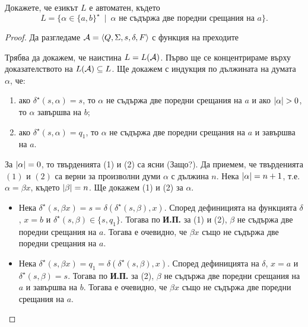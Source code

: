 \begin{problem}
  Докажете, че езикът $L$ е автоматен, където
  \[L = \{\alpha \in \{a,b\}^\star\ \mid\ \alpha\mbox{ не съдържа две поредни срещания на }a\}.\]
\end{problem}
\begin{proof}
  Да разгледаме $\mathcal{A} = \langle{Q,\Sigma,s,\delta,F}\rangle$ с функция на преходите
  \begin{figure}[H]
    \begin{center}
    \end{center}
 \end{figure}

 Трябва да докажем, че наистина $L = L(\mathcal{A})$.
 Първо ще се концентрираме върху доказателството на $L(\mathcal{A}) \subseteq L$.
 Ще докажем с индукция по дължината на думата $\alpha$, че:
 \begin{enumerate}[(1)]
 \item 
   ако $\delta^\star(s,\alpha) = s$, то
   $\alpha$ не съдържа две поредни срещания на $a$
   и ако $\lvert{\alpha}\rvert > 0$, то $\alpha$ завършва на $b$;
 \item
   ако $\delta^\star(s,\alpha) = q_1$, то
   $\alpha$ не съдържа две поредни срещания на $a$
   и завършва на $a$.
 \end{enumerate}

 За $\lvert{\alpha}\rvert = 0$, то твърденията (1) и (2) са ясни (Защо?).
 Да приемем, че твърденията $(1)$ и $(2)$ са верни за произволни думи $\alpha$ с дължина $n$.
 Нека $\lvert{\alpha}\rvert = n+1$, т.е. $\alpha = \beta x$, където $\lvert{\beta}\rvert = n$.
 Ще докажем (1) и (2) за $\alpha$.
 \begin{itemize}[-]
 \item 
   Нека $\delta^\star(s,\beta x) = s = \delta(\delta^\star(s,\beta),x)$.
   Според дефиницията на функцията $\delta$, $x = b$ и $\delta^\star(s,\beta) \in \{s,q_1\}$.
   Тогава по {\bf И.П.} за (1) и (2), $\beta$ не съдържа две поредни срещания на $a$.
   Тогава е очевидно, че $\beta x$ също не съдържа две поредни срещания на $a$.
 \item
   Нека $\delta^\star(s,\beta x) = q_1 = \delta(\delta^\star(s,\beta),x)$.
   Според дефиницията на $\delta$, $x = a$ и $\delta^\star(s,\beta) = s$.
   Тогава по {\bf И.П.} за (2), $\beta$ не съдържа две поредни срещания на $a$
   и завършва на $b$.
   Тогава е очевидно, че $\beta x$ също не съдържа две поредни срещания на $a$.
 \end{itemize}
 

\end{proof}
